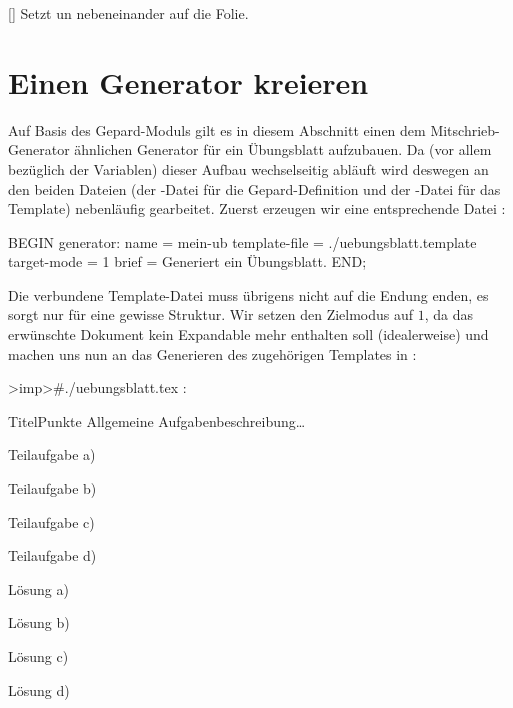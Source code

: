 []
Setzt  un  nebeneinander auf die Folie.

\section{Einen Generator kreieren}
Auf Basis des Gepard-Moduls  gilt es in diesem Abschnitt einen dem Mitschrieb-Generator ähnlichen Generator für ein Übungsblatt aufzubauen. Da (vor allem bezüglich der Variablen) dieser Aufbau wechselseitig abläuft wird deswegen an den beiden Dateien (der -Datei für die Gepard-Definition und der -Datei für das Template) nebenläufig gearbeitet. Zuerst erzeugen wir eine entsprechende Datei :
\begin{gepard}
BEGIN generator:
    name                   = mein-ub
    template-file          = ./uebungsblatt.template
    target-mode            = 1
    brief                  = Generiert ein Übungsblatt.
END;
\end{gepard}
Die verbundene Template-Datei muss übrigens nicht auf die Endung  enden, es sorgt nur für eine gewisse Struktur. Wir setzen den Zielmodus auf $1$, da das erwünschte Dokument kein Expandable mehr enthalten soll (idealerweise) und machen uns nun an das Generieren des zugehörigen Templates in :
\begin{gepard}
>imp>#./uebungsblatt.tex
:
\begin{aufgabe}{Titel}{Punkte}
    Allgemeine Aufgabenbeschreibung\ldots
    \begin{aufgaben}[!**!2!**!]
        \item Teilaufgabe a)
        \item Teilaufgabe b)
        \item Teilaufgabe c)
        \item Teilaufgabe d)
    \end{aufgaben}
\vSplitter
    \begin{aufgaben}
        \item Lösung a)
        \item Lösung b)
        \item Lösung c)
        \item Lösung d)
    \end{aufgaben}
\end{aufgabe}
\end{gepard}
